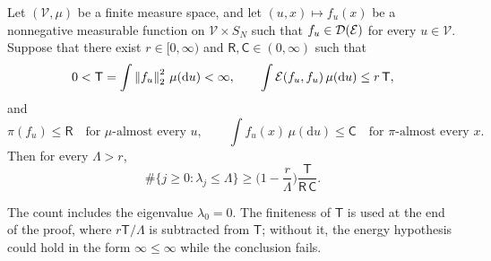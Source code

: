 \begin{lemma}\label{lem:sp-frame}
Let $(\mathcal V,\mu)$ be a finite measure space, and let $(u,x)\mapsto f_u(x)$ be a nonnegative measurable function on $\mathcal V\times S_N$ such that $f_u\in\mathcal D(\mathcal E)$ for every $u\in\mathcal V$. Suppose that there exist $r\in[0,\infty)$ and $\mathsf R,\mathsf C\in(0,\infty)$ such that
\begin{equation}\label{eq:sp-frame-trace}
0<\mathsf T=\int\left\lVert f_u\right\rVert_2^2\,\mu(\mathrm du)<\infty,\qquad
\int\mathcal E(f_u,f_u)\,\mu(\mathrm du)\le r\,\mathsf T,
\end{equation}
and
\begin{equation}\label{eq:sp-frame-rowcol}
\pi(f_u)\le\mathsf R\quad\text{for $\mu$-almost every $u$},\qquad
\int f_u(x)\,\mu(\mathrm du)\le\mathsf C\quad\text{for $\pi$-almost every $x$}.
\end{equation}
Then for every $\Lambda>r$,
\[
\#\{j\ge0:\lambda_j\le\Lambda\}\ge\Big(1-\frac r\Lambda\Big)\frac{\mathsf T}{\mathsf R\,\mathsf C}.
\]
\end{lemma}

The count includes the eigenvalue $\lambda_0=0$. The finiteness of $\mathsf T$ is used at the end of the proof, where $r\mathsf T/\Lambda$ is subtracted from $\mathsf T$; without it, the energy hypothesis could hold in the form $\infty\le\infty$ while the conclusion fails.

